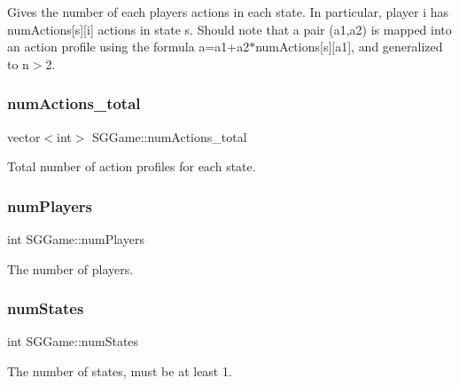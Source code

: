 Gives the number of each player\textquotesingle{}s actions in each state. In particular, player i has num\+Actions\mbox{[}s\mbox{]}\mbox{[}i\mbox{]} actions in state s. Should note that a pair (a1,a2) is mapped into an action profile using the formula a=a1+a2$\ast$num\+Actions\mbox{[}s\mbox{]}\mbox{[}a1\mbox{]}, and generalized to n$>$2. \mbox{\label{classSGGame_a3b219a37177b5b8b38737f570e419429}} 
\subsubsection{\texorpdfstring{num\+Actions\+\_\+total}{numActions\_total}}
{\footnotesize\ttfamily vector$<$int$>$ S\+G\+Game\+::num\+Actions\+\_\+total\hspace{0.3cm}{\ttfamily [private]}}

Total number of action profiles for each state. \mbox{\label{classSGGame_a6f02e3f92db6a3c5d2d9076dcb7b6d61}} 
\subsubsection{\texorpdfstring{num\+Players}{numPlayers}}
{\footnotesize\ttfamily int S\+G\+Game\+::num\+Players\hspace{0.3cm}{\ttfamily [private]}}

The number of players. \mbox{\label{classSGGame_ae7b105b2fe9ee277d38e518223dd0482}} 
\subsubsection{\texorpdfstring{num\+States}{numStates}}
{\footnotesize\ttfamily int S\+G\+Game\+::num\+States\hspace{0.3cm}{\ttfamily [private]}}

The number of states, must be at least 1. \mbox{\label{classSGGame_aad28dd39c6359e772286a938a948634c}} 
